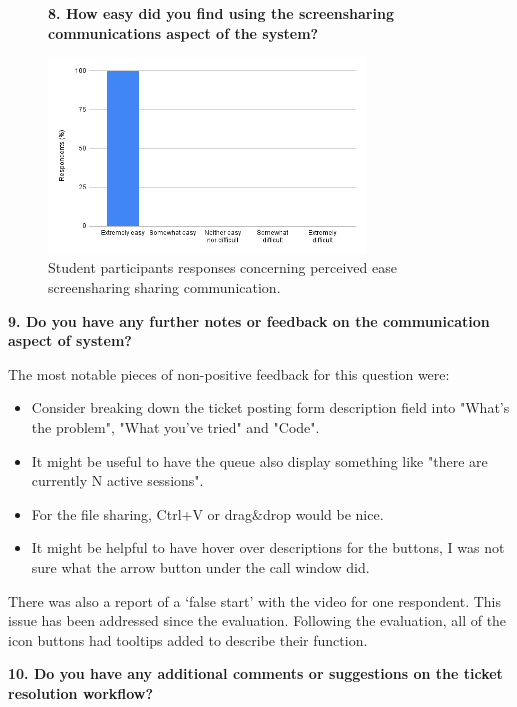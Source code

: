 \begin{figure}[H]
    \centering
    \textbf{8. How easy did you find using the screensharing communications aspect of the system?}\par\medskip
    \includegraphics[width=0.75\textwidth]{10evaluation/images/stud8.png}
    \caption{Student participants responses concerning perceived ease screensharing sharing communication.}
    \label{fig:stud8}
\end{figure}

\textbf{9. Do you have any further notes or feedback on the communication aspect of system?}\par\medskip

The most notable pieces of non-positive feedback for this question were:

\begin{itemize}
    \item Consider breaking down the ticket posting form description field into "What's the problem", "What you've tried" and "Code".
    \item It might be useful to have the queue also display something like "there are currently N active sessions".
    \item For the file sharing, Ctrl+V or drag\&drop would be nice.
    \item It might be helpful to have hover over descriptions for the buttons, I was not sure what the arrow button under the call window did.
\end{itemize}

There was also a report of a `false start' with the video for one respondent. This issue has been addressed since the evaluation. Following the evaluation, all of the icon buttons had tooltips added to describe their function.

\textbf{10. Do you have any additional comments or suggestions on the ticket resolution workflow?}\par\medskip

